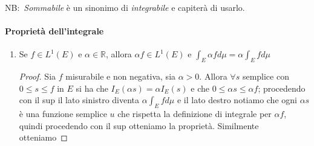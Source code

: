 NB:~\emph{Sommabile} è un sinonimo di \emph{integrabile} e capiterà di
usarlo.
\paragraph{Proprietà dell'integrale}
\begin{enumerate}[label = \arabic*.]
    \item Se \(f \in L^{1}(E)\) e \(\alpha \in \mathbb{R}\), allora \(\alpha f
        \in  L^{1}(E)\) e \(\int_E \alpha f d\mu = \alpha \int_E f d\mu\) 
    \begin{proof}
        Sia \(f\) misurabile e non negativa, sia \(\alpha > 0\). Allora
        \(\forall s\) semplice con \(0 \le s \le f\) in \(E\) si ha che
        \(I_E(\alpha s) = \alpha I_E(s)\) e che \(0 \le \alpha s \le \alpha f\);
         procedendo con il sup il lato sinistro diventa \(\alpha \int_E f d\mu\)
         e il lato destro notiamo che ogni \(\alpha s\) è una funzione semplice
         \(u\) che rispetta la definizione di integrale per \(\alpha f\), quindi
         procedendo con il sup otteniamo la proprietà. Similmente otteniamo 


\end{proof}
\end{enumerate}
